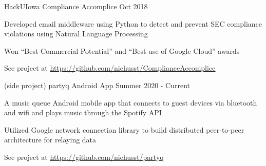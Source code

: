 \documentclass[12pt, a4paper]{awesome-cv}
\begin{document}
\begin{cventries}

    \cventry
	{HackUIowa}
 	{Compliance Accomplice}
	{Oct 2018}
	{}
	{
	  \begin{cvitems}
	     \item{Developed email middleware using Python to detect and prevent SEC compliance violations using Natural Language Processing}
	     \item{Won “Best Commercial Potential” and “Best use of Google Cloud” awards}
	     \item{See project at \underline{\href{https://github.com/niehusst/ComplianceAccomplice}{https://github.com/niehusst/ComplianceAccomplice}}} 
	  \end{cvitems}
	}

  \cventry
    {(side project)}
    {partyq Android App}
    {Summer 2020 - Current}
    {}
    {
      \begin{cvitems}
        \item{A music queue Android mobile app that connects to guest devices via bluetooth and wifi and plays music through the Spotify API}
        \item{Utilized Google network connection library to build distributed peer-to-peer architecture for relaying data}
        \item{See project at \underline{\href{https://github.com/niehusst/partyq}{https://github.com/niehusst/partyq}}}
      \end{cvitems}
    }



\end{cventries}
\end{document}
